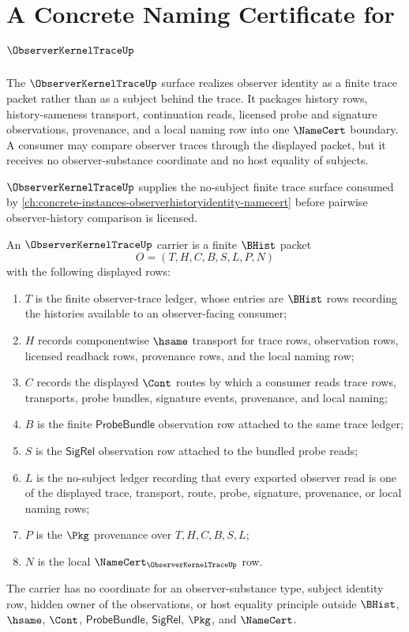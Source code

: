\chapter{A Concrete Naming Certificate for $\ObserverKernelTraceUp$}
\label{ch:concrete-instances-observerkerneltrace-namecert}

The $\ObserverKernelTraceUp$ surface realizes observer identity as a finite trace packet rather than as a subject behind the trace. It packages history rows, history-sameness transport, continuation reads, licensed probe and signature observations, provenance, and a local naming row into one $\NameCert$ boundary. A consumer may compare observer traces through the displayed packet, but it receives no observer-substance coordinate and no host equality of subjects.

$\ObserverKernelTraceUp$ supplies the no-subject finite trace surface consumed by \autoref{ch:concrete-instances-observerhistoryidentity-namecert} before pairwise observer-history comparison is licensed.

\begin{definition}
\label{def:observer-kernel-trace-carrier}
An $\ObserverKernelTraceUp$ carrier is a finite $\BHist$ packet
$$
O=(T,H,C,B,S,L,P,N)
$$
with the following displayed rows:
\begin{enumerate}
\item $T$ is the finite observer-trace ledger, whose entries are $\BHist$ rows recording the histories available to an observer-facing consumer;
\item $H$ records componentwise $\hsame$ transport for trace rows, observation rows, licensed readback rows, provenance rows, and the local naming row;
\item $C$ records the displayed $\Cont$ routes by which a consumer reads trace rows, transports, probe bundles, signature events, provenance, and local naming;
\item $B$ is the finite $\mathsf{ProbeBundle}$ observation row attached to the same trace ledger;
\item $S$ is the $\mathsf{SigRel}$ observation row attached to the bundled probe reads;
\item $L$ is the no-subject ledger recording that every exported observer read is one of the displayed trace, transport, route, probe, signature, provenance, or local naming rows;
\item $P$ is the $\Pkg$ provenance over $T,H,C,B,S,L$;
\item $N$ is the local $\NameCert_{\ObserverKernelTraceUp}$ row.
\end{enumerate}
The carrier has no coordinate for an observer-substance type, subject identity row, hidden owner of the observations, or host equality principle outside $\BHist$, $\hsame$, $\Cont$, $\mathsf{ProbeBundle}$, $\mathsf{SigRel}$, $\Pkg$, and $\NameCert$.
\end{definition}

